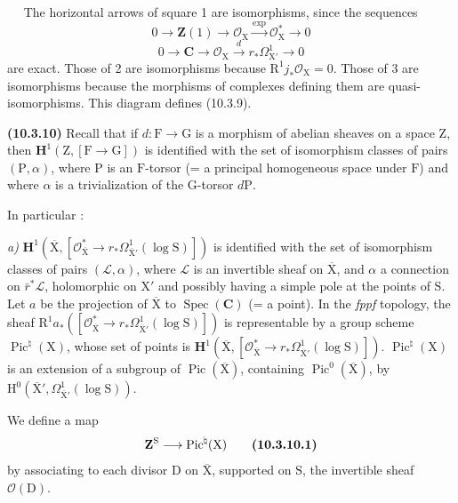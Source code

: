 \documentclass[11pt,leqno]{article}
\newcommand{\Page}[1]{\ifvmode\noindent\else\unskip\ \fi{\footnotesize\textcolor{gray}{[p.\,#1]}}\ \ignorespaces}
\begin{document}
\Page{72}
The horizontal arrows of square 1 are isomorphisms, since the sequences
\[
0\longrightarrow\mathbf{Z}(1)
\longrightarrow\mathcal{O}_{\mathrm{X}}
\xrightarrow{\exp}\mathcal{O}_{\mathrm{X}}^{*}
\longrightarrow0
\]
\[
0\longrightarrow\mathbf{C}
\longrightarrow\mathcal{O}_{\mathrm{X}}
\xrightarrow{d}r_*\Omega^{1}_{\mathrm{X}'}
\longrightarrow0
\]
are exact. Those of 2 are isomorphisms because \(\mathrm{R}^{1}j_*\mathcal{O}_{\mathrm{X}}=0\). Those of 3 are isomorphisms because the morphisms of complexes defining them are quasi-isomorphisms. This diagram defines (10.3.9).

\textbf{(10.3.10)} Recall that if \(d:\mathrm{F}\to\mathrm{G}\) is a morphism of abelian sheaves on a space \(\mathrm{Z}\), then \(\mathbf{H}^{1}(\mathrm{Z},[\mathrm{F}\to\mathrm{G}])\) is identified with the set of isomorphism classes of pairs \((\mathrm{P},\alpha)\), where \(\mathrm{P}\) is an \(\mathrm{F}\)-torsor (= a principal homogeneous space under \(\mathrm{F}\)) and where \(\alpha\) is a trivialization of the \(\mathrm{G}\)-torsor \(d\mathrm{P}\).

In particular :

\textit{a)} \(\mathbf{H}^{1}(\overline{\mathrm{X}},[\mathcal{O}_{\overline{\mathrm{X}}}^{*}\to r_*\Omega^{1}_{\overline{\mathrm{X}}'}(\log\mathrm{S})])\) is identified with the set of isomorphism classes of pairs \((\mathcal{L},\alpha)\), where \(\mathcal{L}\) is an invertible sheaf on \(\overline{\mathrm{X}}\), and \(\alpha\) a connection on \(\bar r^{*}\mathcal{L}\), holomorphic on \(\mathrm{X}'\) and possibly having a simple pole at the points of \(\mathrm{S}\). Let \(a\) be the projection of \(\overline{\mathrm{X}}\) to \(\operatorname{Spec}(\mathbf{C})\) (= a point). In the \textit{fppf} topology, the sheaf \(\mathrm{R}^{1}a_*([\mathcal{O}_{\overline{\mathrm{X}}}^{*}\to r_*\Omega^{1}_{\overline{\mathrm{X}}'}(\log\mathrm{S})])\) is representable by a group scheme \(\operatorname{Pic}^{\natural}(\mathrm{X})\), whose set of points is \(\mathbf{H}^{1}(\overline{\mathrm{X}},[\mathcal{O}_{\overline{\mathrm{X}}}^{*}\to r_*\Omega^{1}_{\overline{\mathrm{X}}'}(\log\mathrm{S})])\). \(\operatorname{Pic}^{\natural}(\mathrm{X})\) is an extension of a subgroup of \(\operatorname{Pic}(\overline{\mathrm{X}})\), containing \(\operatorname{Pic}^{0}(\overline{\mathrm{X}})\), by \(\mathrm{H}^{0}(\overline{\mathrm{X}}',\Omega^{1}_{\overline{\mathrm{X}}'}(\log\mathrm{S}))\).

We define a map
\[
\mathbf{Z}^{\mathrm{S}}\longrightarrow\operatorname{Pic}^{\natural}(\mathrm{X})
\tag*{\textbf{(10.3.10.1)}}
\]
by associating to each divisor \(\mathrm{D}\) on \(\overline{\mathrm{X}}\), supported on \(\mathrm{S}\), the invertible sheaf \(\mathcal{O}(\mathrm{D})\).
\end{document}
